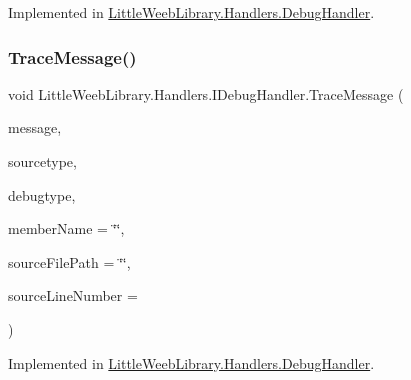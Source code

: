 Implemented in \mbox{\hyperlink{class_little_weeb_library_1_1_handlers_1_1_debug_handler_ac253016968e2d0141b49ab227a715242}{Little\+Weeb\+Library.\+Handlers.\+Debug\+Handler}}.

\mbox{\label{interface_little_weeb_library_1_1_handlers_1_1_i_debug_handler_a2e405bc3492e683cd3702fae125221bc}} 
\subsubsection{\texorpdfstring{Trace\+Message()}{TraceMessage()}}
{\footnotesize\ttfamily void Little\+Weeb\+Library.\+Handlers.\+I\+Debug\+Handler.\+Trace\+Message (\begin{DoxyParamCaption}\item[{string}]{message,  }\item[{\mbox{\hyperlink{namespace_little_weeb_library_1_1_handlers_a2a6ca0775121c9c503d58aa254d292be}{Debug\+Source}}}]{sourcetype,  }\item[{\mbox{\hyperlink{namespace_little_weeb_library_1_1_handlers_ab66019ed40462876ec4e61bb3ccb0a62}{Debug\+Type}}}]{debugtype,  }\item[{\mbox{[}\+System.\+Runtime.\+Compiler\+Services.\+Caller\+Member\+Name\mbox{]} string}]{member\+Name = {\ttfamily \char`\"{}\char`\"{}},  }\item[{\mbox{[}\+System.\+Runtime.\+Compiler\+Services.\+Caller\+File\+Path\mbox{]} string}]{source\+File\+Path = {\ttfamily \char`\"{}\char`\"{}},  }\item[{\mbox{[}\+System.\+Runtime.\+Compiler\+Services.\+Caller\+Line\+Number\mbox{]} int}]{source\+Line\+Number = {} }\end{DoxyParamCaption})}



Implemented in \mbox{\hyperlink{class_little_weeb_library_1_1_handlers_1_1_debug_handler_afccb37dfd6b2114af72000c2f4fe4607}{Little\+Weeb\+Library.\+Handlers.\+Debug\+Handler}}.




